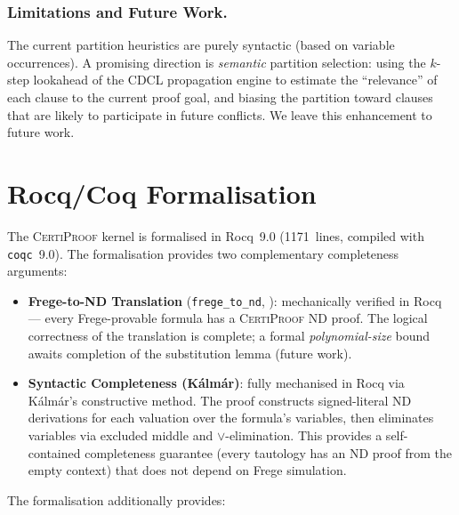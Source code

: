\documentclass[acmtocl,review,anonymous]{acmart}
\newcommand{\CP}{\textsc{CertiProof}}
\begin{document}
\subsubsection*{Limitations and Future Work.}
The current partition heuristics are purely syntactic (based on
variable occurrences).  A promising direction is
\emph{semantic} partition selection: using the $k$-step lookahead
of the CDCL propagation engine to estimate the ``relevance'' of each
clause to the current proof goal, and biasing the partition toward
clauses that are likely to participate in future conflicts.  We
leave this enhancement to future work.

\section{Rocq/Coq Formalisation}
\label{sec:rocq}

The \CP{} kernel is formalised in Rocq~9.0 (1171~lines, compiled
with \texttt{coqc}~9.0).  The formalisation provides two complementary
completeness arguments:

\begin{itemize}
  \item \textbf{Frege-to-ND Translation} (\texttt{frege\_to\_nd},
    ): mechanically verified in Rocq --- every
    Frege-provable formula has a \CP{} ND proof.  The logical
    correctness of the translation is complete; a formal
    \emph{polynomial-size} bound awaits completion of the substitution
    lemma (future work).
  \item \textbf{Syntactic Completeness (K\'{a}lm\'{a}r)}: fully
    mechanised in Rocq via K\'{a}lm\'{a}r's constructive method.
    The proof constructs signed-literal ND derivations for each
    valuation over the formula's variables, then eliminates variables
    via excluded middle and $\lor$-elimination.  This provides a
    self-contained completeness guarantee (every tautology has an ND
    proof from the empty context) that does not depend on Frege
    simulation.
\end{itemize}

The formalisation additionally provides:
\end{document}
